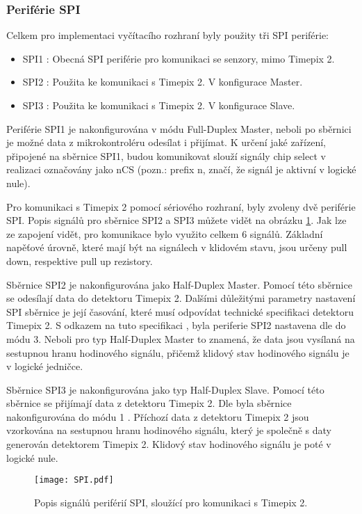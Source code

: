 	\subsubsection{Periférie SPI}
	Celkem pro implementaci vyčítacího rozhraní byly použity tři SPI periférie:
	 \begin{itemize}
	 	\setlength\itemsep{0.005em}
	 	\item SPI1 : Obecná SPI periférie pro komunikaci se senzory, mimo Timepix 2.
	 	\item SPI2 : Použita ke komunikaci s Timepix 2. V konfigurace Master. 
	 	\item SPI3 : Použita ke komunikaci s Timepix 2. V konfigurace Slave.
	 \end{itemize}
 	Periférie SPI1 je nakonfigurována v módu Full-Duplex Master, neboli po sběrnici je možné data z mikrokontroléru odesílat i přijímat. K určení jaké zařízení, připojené na sběrnice SPI1, budou komunikovat slouží signály chip select v realizaci označovány jako nCS (pozn.: prefix n, značí, že signál je aktivní v logické nule). 
 	\par Pro komunikaci s Timepix 2 pomocí sériového rozhraní, byly zvoleny dvě periférie SPI. Popis signálů pro sběrnice SPI2 a SPI3 můžete vidět na obrázku \ref{fig:SPI}. Jak lze ze zapojení vidět, pro komunikace bylo využito celkem 6 signálů. Základní napěťové úrovně, které mají být na signálech v klidovém stavu, jsou určeny pull down, respektive pull up rezistory. 
 	\par Sběrnice SPI2 je nakonfigurována jako Half-Duplex Master. Pomocí této sběrnice se odesílají data do detektoru Timepix 2. Dalšími důležitými parametry nastavení SPI sběrnice je její časování, které musí odpovídat technické specifikaci detektoru Timepix 2. S odkazem na tuto specifikaci \cite{Timepix2}, byla periferie SPI2 nastavena dle \cite{SPI} do módu 3. Neboli pro typ Half-Duplex Master to znamená, že data jsou vysílaná na sestupnou hranu hodinového signálu, přičemž klidový stav hodinového signálu je v logické jedničce.
 	\par Sběrnice SPI3 je nakonfigurována jako typ Half-Duplex Slave. Pomocí této sběrnice se přijímají data z detektoru Timepix 2. Dle \cite{Timepix2} byla sběrnice nakonfigurována do módu 1 \cite{SPI}. Příchozí data z detektoru Timepix 2 jsou vzorkována na sestupnou hranu hodinového signálu, který je společně s daty generován detektorem Timepix 2. Klidový stav hodinového signálu je poté v logické nule.
	\begin{figure}[h!]
 		\centering
 		\captionsetup{justification=centering}
 		\texttt{[image: SPI.pdf]}
 		\caption{Popis signálů periférií SPI, sloužící pro komunikaci s Timepix 2.} 
 		\label{fig:SPI}
 	\end{figure}
 	
